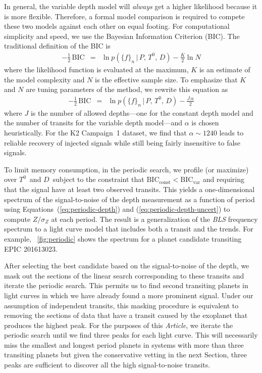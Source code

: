 \documentclass[12pt,preprint]{aastex}
\newcommand{\project}[1]{\textsl{#1}} %
\newcommand{\paper}{\textsl{Article}}
\newcommand{\figref}[1]{\ref{fig:#1}}
\newcommand{\Fig}[1]{\figurename~\figref{#1}}
\newcommand{\fig}[1]{\Fig{#1}}
\newcommand{\sectionname}{Section}
\newcommand{\BIC}{{\ensuremath{\mathrm{BIC}}}}
\newcommand{\flux}{{\ensuremath{f}}}
\newcommand{\period}{{\ensuremath{P}}}
\newcommand{\phase}{{\ensuremath{T^0}}}
\newcommand{\duration}{{\ensuremath{D}}}
\newcommand{\depth}{{\ensuremath{Z}}}
\begin{document}
In general, the variable depth model will \emph{always} get a higher
likelihood because it is more flexible.
Therefore, a formal model comparison is required to compete these two models
against each other on equal footing.
For computational simplicity and speed, we use the Bayesian Information
Criterion (BIC).
The traditional definition of the BIC is
\begin{eqnarray}
-\frac{1}{2}\,\BIC &=&
    \ln p(\{\flux\}_n\,|\,\period,\,\phase,\,\duration)
    - \frac{K}{2} \ln N
\end{eqnarray}
where the likelihood function is evaluated at the maximum, $K$ is an estimate
of the model complexity and $N$ is the effective sample size.
To emphasize that $K$ and $N$ are tuning parameters of the method, we
rewrite this equation as
\begin{eqnarray}
-\frac{1}{2}\,\BIC &=&
    \ln p(\{\flux\}_n\,|\,\period,\,\phase,\,\duration) -
        \frac{J\,\alpha}{2}
\end{eqnarray}
where $J$ is the number of allowed depths---one for the constant depth model
and the number of transits for the variable depth model---and $\alpha$ is
chosen heuristically.
For the K2 Campaign~1 dataset, we find that $\alpha \sim 1240$ leads to
reliable recovery of injected signals while still being fairly insensitive to
false signals.

To limit memory consumption, in the periodic search, we profile (or maximize)
over \phase\ and \duration\ subject to the constraint that
$\BIC_\mathrm{const} < \BIC_\mathrm{var}$ and requiring that the signal have
at least two observed transits.
This yields a one-dimensional spectrum of the signal-to-noise of the depth
measurement as a function of period using Equations~(\ref{eq:periodic-depth})
and (\ref{eq:periodic-depth-uncert}) to compute $\depth/\sigma_\depth$ at
each period.
The result is a generalization of the \project{BLS} frequency spectrum
\citep{Kovacs:2002} to a light curve model that includes both a transit and
the trends.
For example, \fig{periodic} shows the spectrum for a planet candidate
transiting EPIC 201613023.

After selecting the best candidate based on the signal-to-noise of the depth,
we mask out the sections of the linear search corresponding to these transits
and iterate the periodic search.
This permits us to find second transiting planets in light curves in which
we have already found a more prominent signal.
Under our assumption of independent transits, this masking procedure is
equivalent to removing the sections of data that have a transit caused by the
exoplanet that produces the highest peak.
For the purposes of this \paper, we iterate the periodic search until we find
three peaks for each light curve.
This will necessarily miss the smallest and longest period planets in systems
with more than three transiting planets but given the conservative vetting in
the next \sectionname, three peaks are sufficient to discover all the high
signal-to-noise transits.
\end{document}
